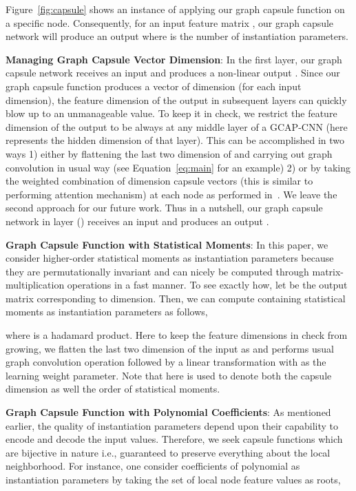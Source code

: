 \documentclass{article}
\begin{document}
Figure~\ref{fig:capsule} shows an instance of applying  our graph capsule function   on a specific node. Consequently,  for an input feature matrix , our graph capsule network will produce an output   where  is the number of instantiation parameters.


\noindent \textbf{Managing Graph Capsule Vector Dimension}: In the first layer, our graph capsule network receives an input  and produces a non-linear output . Since our graph capsule function produces a vector of  dimension (for each input  dimension), the feature  dimension of the output in subsequent layers can quickly blow up to an unmanageable value. To keep it in check, we restrict the feature  dimension of the output  to be always   at any middle layer of a GCAP-CNN (here  represents the hidden dimension of that layer). This can be accomplished in two ways  1) either by flattening the last two dimension of    and carrying out graph convolution in usual way (see Equation~\ref{eq:main} for an example)  2) or  by taking the weighted combination of dimension capsule vectors  (this is similar to performing attention mechanism) at each node as performed in~\cite{sabour2017dynamic}. We leave the second approach for our future work.  Thus in a nutshell,   our graph capsule network in  layer () receives an input  and produces an output  .



\noindent \textbf{Graph Capsule Function with Statistical Moments}: In this paper,  we consider higher-order statistical moments as instantiation parameters because they are permutationally invariant and can nicely be computed through   matrix-multiplication operations in a fast manner. To see exactly how, let  be the output  matrix corresponding to  dimension. Then, we can  compute   containing statistical moments as instantiation parameters as follows, 



 where  is a hadamard  product. Here to keep the feature dimensions in check from growing, we flatten the last two dimension of the input as  
 and performs usual graph convolution operation followed by a  linear transformation with   as the learning weight parameter. Note that here  is used to denote both the capsule dimension as well   the order of statistical moments.


\noindent \textbf{Graph Capsule Function with Polynomial Coefficients}: As mentioned earlier, the quality of instantiation parameters depend upon their capability to encode and decode the  input values. Therefore, we   seek capsule functions which are bijective in nature i.e., guaranteed to preserve everything about the local neighborhood. For instance, one consider coefficients of polynomial as instantiation parameters by taking the set of local node  feature values as roots, 
\end{document}

